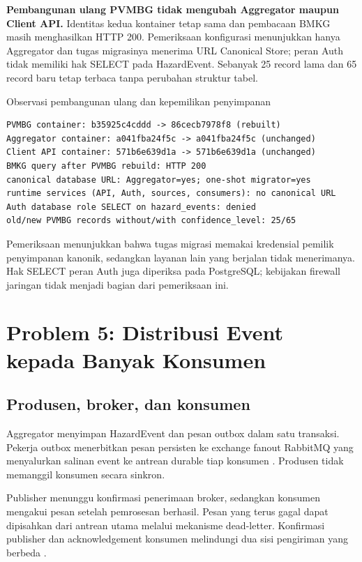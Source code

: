 \documentclass{fairmeta}
\begin{document}
\textbf{Pembangunan ulang PVMBG tidak mengubah Aggregator maupun Client API.} Identitas kedua kontainer tetap sama dan pembacaan BMKG masih menghasilkan HTTP 200. Pemeriksaan konfigurasi menunjukkan hanya Aggregator dan tugas migrasinya menerima URL Canonical Store; peran Auth tidak memiliki hak SELECT pada HazardEvent. Sebanyak 25 record lama dan 65 record baru tetap terbaca tanpa perubahan struktur tabel.

\begin{evidencebox}{Observasi pembangunan ulang dan kepemilikan penyimpanan}
\begin{lstlisting}
PVMBG container: b35925c4cddd -> 86cecb7978f8 (rebuilt)
Aggregator container: a041fba24f5c -> a041fba24f5c (unchanged)
Client API container: 571b6e639d1a -> 571b6e639d1a (unchanged)
BMKG query after PVMBG rebuild: HTTP 200
canonical database URL: Aggregator=yes; one-shot migrator=yes
runtime services (API, Auth, sources, consumers): no canonical URL
Auth database role SELECT on hazard_events: denied
old/new PVMBG records without/with confidence_level: 25/65
\end{lstlisting}
\noindent\small Pemeriksaan menunjukkan bahwa tugas migrasi memakai kredensial pemilik penyimpanan kanonik, sedangkan layanan lain yang berjalan tidak menerimanya. Hak SELECT peran Auth juga diperiksa pada PostgreSQL; kebijakan firewall jaringan tidak menjadi bagian dari pemeriksaan ini.
\end{evidencebox}

\section{Problem 5: Distribusi Event kepada Banyak Konsumen}

\subsection{Produsen, broker, dan konsumen}

Aggregator menyimpan HazardEvent dan pesan outbox dalam satu transaksi. Pekerja outbox menerbitkan pesan persisten ke exchange fanout RabbitMQ yang menyalurkan salinan event ke antrean durable tiap konsumen \cite{rabbit-exchanges}. Produsen tidak memanggil konsumen secara sinkron.

Publisher menunggu konfirmasi penerimaan broker, sedangkan konsumen mengakui pesan setelah pemrosesan berhasil. Pesan yang terus gagal dapat dipisahkan dari antrean utama melalui mekanisme dead-letter. Konfirmasi publisher dan acknowledgement konsumen melindungi dua sisi pengiriman yang berbeda \cite{rabbit-confirms}.
\end{document}
